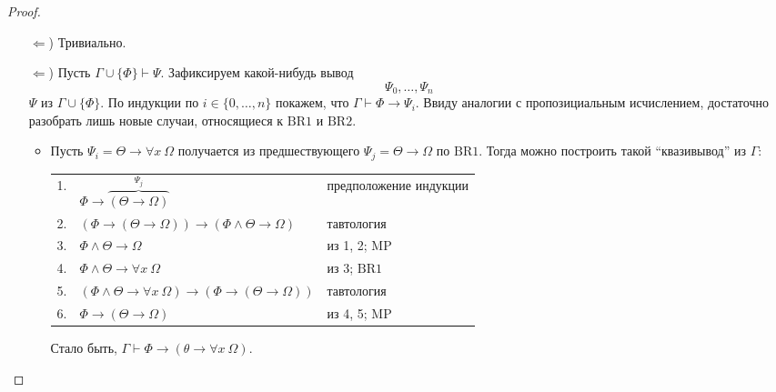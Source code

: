 \documentclass[12pt,a4paper]{article}
\begin{document}
    \begin{proof}
        \begin{itemize}
            \item[$\Leftarrow$)] Тривиально.
            \item[$\Leftarrow$)] Пусть $\Gamma \cup \{\Phi\} \vdash \Psi$. Зафиксируем какой-нибудь вывод
                \[\Psi_0, \dots, \Psi_n\]
                $\Psi$ из $\Gamma \cup \{\Phi\}$. По индукции по $i \in \{0, \dots, n\}$ покажем, что $\Gamma \vdash \Phi \rightarrow \Psi_i$. Ввиду аналогии с пропозициальным исчислением, достаточно разобрать лишь новые случаи, относящиеся к $\mathrm{BR1}$ и $\mathrm{BR2}$.
                \begin{itemize}
                    \item Пусть $\Psi_i = \Theta \rightarrow \forall x\ \Omega$ получается из предшествующего $\Psi_j = \Theta \rightarrow \Omega$ по $\mathrm{BR1}$. Тогда можно построить такой ``квазивывод'' из $\Gamma$:
                        \begin{center}
                            \begin{tabular}{rll}
                                1.& $\Phi \rightarrow \overbrace{(\Theta \rightarrow \Omega)}^{\Psi_j}$& предположение индукции\\
                                2.& $(\Phi \rightarrow (\Theta \rightarrow \Omega)) \rightarrow (\Phi \wedge \Theta \rightarrow \Omega)$& тавтология\\
                                3.& $\Phi \wedge \Theta \rightarrow \Omega$& из 1, 2; $\mathrm{MP}$\\
                                4.& $\Phi \wedge \Theta \rightarrow \forall x\ \Omega$& из 3; $\mathrm{BR1}$\\
                                5.& $(\Phi \wedge \Theta \rightarrow \forall x\ \Omega) \rightarrow (\Phi \rightarrow (\Theta \rightarrow \Omega))$& тавтология\\
                                6.& $\Phi \rightarrow (\Theta \rightarrow \Omega)$& из 4, 5; $\mathrm{MP}$\\
                            \end{tabular}
                        \end{center}
                        Стало быть, $\Gamma \vdash \Phi \rightarrow (\theta \rightarrow \forall x\ \Omega)$.
                    

\end{itemize}
\end{itemize}
\end{proof}
\end{document}
